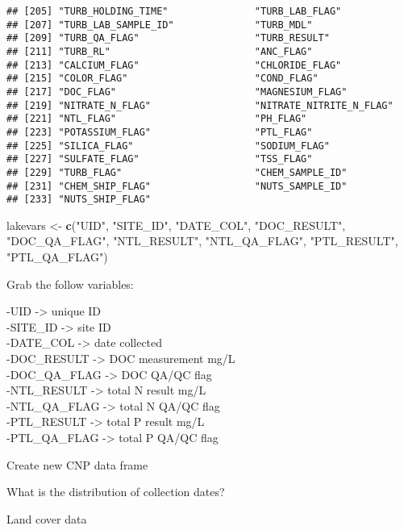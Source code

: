 \documentclass[]{article}
\newenvironment{Shaded}{\begin{snugshade}}{\end{snugshade}}
\newcommand{\KeywordTok}[1]{\textcolor[rgb]{0.13,0.29,0.53}{\textbf{#1}}}
\newcommand{\NormalTok}[1]{#1}
\newcommand{\StringTok}[1]{\textcolor[rgb]{0.31,0.60,0.02}{#1}}
\begin{document}
\begin{verbatim}
## [205] "TURB_HOLDING_TIME"               "TURB_LAB_FLAG"                  
## [207] "TURB_LAB_SAMPLE_ID"              "TURB_MDL"                       
## [209] "TURB_QA_FLAG"                    "TURB_RESULT"                    
## [211] "TURB_RL"                         "ANC_FLAG"                       
## [213] "CALCIUM_FLAG"                    "CHLORIDE_FLAG"                  
## [215] "COLOR_FLAG"                      "COND_FLAG"                      
## [217] "DOC_FLAG"                        "MAGNESIUM_FLAG"                 
## [219] "NITRATE_N_FLAG"                  "NITRATE_NITRITE_N_FLAG"         
## [221] "NTL_FLAG"                        "PH_FLAG"                        
## [223] "POTASSIUM_FLAG"                  "PTL_FLAG"                       
## [225] "SILICA_FLAG"                     "SODIUM_FLAG"                    
## [227] "SULFATE_FLAG"                    "TSS_FLAG"                       
## [229] "TURB_FLAG"                       "CHEM_SAMPLE_ID"                 
## [231] "CHEM_SHIP_FLAG"                  "NUTS_SAMPLE_ID"                 
## [233] "NUTS_SHIP_FLAG"
\end{verbatim}

\begin{Shaded}
\begin{Highlighting}[]
\NormalTok{lakevars <-}\StringTok{ }\KeywordTok{c}\NormalTok{(}\StringTok{"UID"}\NormalTok{, }\StringTok{"SITE_ID"}\NormalTok{, }\StringTok{"DATE_COL"}\NormalTok{, }\StringTok{"DOC_RESULT"}\NormalTok{, }\StringTok{"DOC_QA_FLAG"}\NormalTok{, }\StringTok{"NTL_RESULT"}\NormalTok{, }\StringTok{"NTL_QA_FLAG"}\NormalTok{, }\StringTok{"PTL_RESULT"}\NormalTok{, }\StringTok{"PTL_QA_FLAG"}\NormalTok{)}
\end{Highlighting}
\end{Shaded}

Grab the follow variables:

-UID -\textgreater{} unique ID\\
-SITE\_ID -\textgreater{} site ID\\
-DATE\_COL -\textgreater{} date collected\\
-DOC\_RESULT -\textgreater{} DOC measurement mg/L\\
-DOC\_QA\_FLAG -\textgreater{} DOC QA/QC flag\\
-NTL\_RESULT -\textgreater{} total N result mg/L\\
-NTL\_QA\_FLAG -\textgreater{} total N QA/QC flag\\
-PTL\_RESULT -\textgreater{} total P result mg/L\\
-PTL\_QA\_FLAG -\textgreater{} total P QA/QC flag

Create new CNP data frame

What is the distribution of collection dates?

Land cover data
\end{document}
